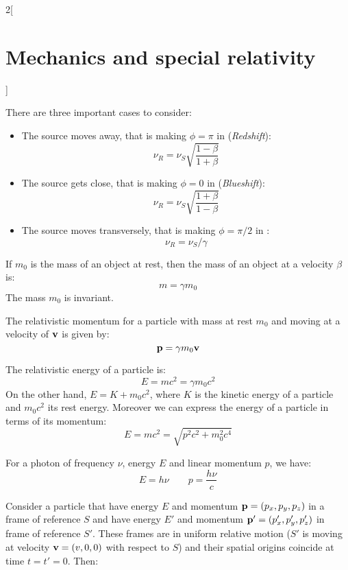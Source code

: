 \documentclass[../../../main_physics.tex]{subfiles}
\begin{document}
\begin{multicols}{2}[\section{Mechanics and special relativity}]
\begin{center}
    \begin{minipage}{\linewidth}
      \centering
      
    \end{minipage}
  \end{center}
  \begin{corollary}
    There are three important cases to consider:
    \begin{itemize}
      \item The source moves away, that is making $\phi=\pi$ in  (\emph{Redshift}):
            $$\nu_R=\nu_S\sqrt{\frac{1-\beta}{1+\beta}}$$
      \item The source gets close, that is making $\phi=0$ in  (\emph{Blueshift}):
            $$\nu_R=\nu_S\sqrt{\frac{1+\beta}{1-\beta}}$$
      \item The source moves transversely, that is making $\phi=\pi/2$ in :$$\nu_R=\nu_S/\gamma$$
    \end{itemize}
  \end{corollary}
  \begin{proposition}
    If $m_0$ is the mass of an object at rest, then the mass of an object at a velocity $\beta$ is: $$m=\gamma m_0$$ The mass $m_0$ is invariant.
  \end{proposition}
  \begin{proposition}
    The relativistic momentum for a particle with mass at rest $m_0$ and moving at a velocity of $\boldsymbol{\mathrm{v}}$ is given by: $$\boldsymbol{\mathrm{p}}=\gamma m_0\boldsymbol{\mathrm{v}}$$
  \end{proposition}
  \begin{proposition}
    The relativistic energy of a particle is: $$E=mc^2=\gamma m_0c^2$$ On the other hand, $E=K+m_0c^2$, where $K$ is the kinetic energy of a particle and $m_0c^2$ its rest energy. Moreover we can express the energy of a particle in terms of its momentum:
    $$E=mc^2=\sqrt{p^2c^2+m_0^2c^4}$$
  \end{proposition}
  \begin{proposition}
    For a photon of frequency $\nu$, energy $E$ and linear momentum $p$, we have:
    $$E=h\nu\qquad p=\frac{h\nu}{c}$$
  \end{proposition}
  \begin{proposition}
    Consider a particle that have energy $E$ and momentum $\boldsymbol{\mathrm{p}}=(p_x,p_y,p_z)$ in a frame of reference $S$ and have energy $E'$ and momentum $\boldsymbol{\mathrm{p}}'=(p_x',p_y',p_z')$ in frame of reference $S'$. These frames are in uniform relative motion ($S'$ is moving at velocity $\boldsymbol{\mathrm{v}}=(v,0,0)$ with respect to $S$) and their spatial origins coincide at time $t=t'=0$. Then:

\end{proposition}
\end{multicols}
\end{document}
